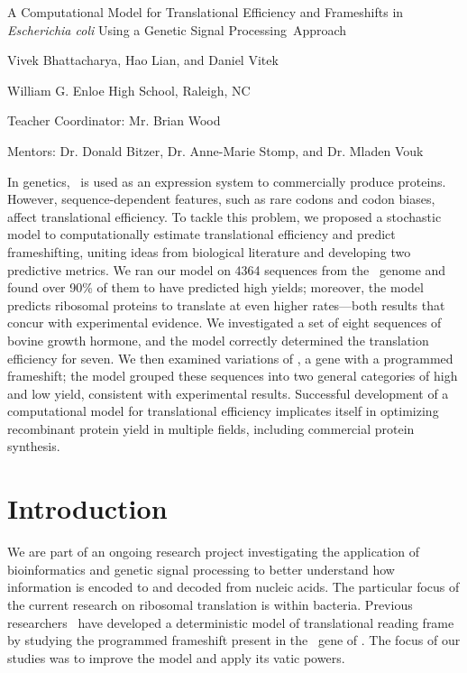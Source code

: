 \documentclass[11pt]{article}
\newcommand{\BWFtitle}[2]{A Computational Model for Translational
  Efficiency and Frameshifts in #1{Escherichia coli} Using a Genetic Signal
  Processing#2Approach}
\begin{document}
\begin{center}
\noindent\BWFtitle{\emph}{~}

Vivek Bhattacharya, Hao Lian, and Daniel Vitek

William G. Enloe High School, Raleigh, NC

Teacher Coordinator: Mr. Brian Wood

Mentors: Dr. Donald Bitzer, Dr. Anne-Marie Stomp, and Dr. Mladen Vouk
\end{center}
\begin{onecolabstract}

In genetics, \ecoli\ is used as an expression system to commercially
produce proteins. However, sequence-dependent features, such as rare
codons and codon biases, affect translational efficiency. To tackle
this problem, we proposed a stochastic model to computationally
estimate translational efficiency and predict frameshifting, uniting
ideas from biological literature and developing two predictive
metrics. We ran our model on 4364 sequences from the \ecoli\ genome
and found over 90\% of them to have predicted high yields; moreover,
the model predicts ribosomal proteins to translate at even higher
rates---both results that concur with experimental evidence. We
investigated a set of eight sequences of bovine growth hormone, and
the model correctly determined the translation efficiency for seven.
We then examined variations of \prfB, a gene with a programmed
frameshift; the model grouped these sequences into two general
categories of high and low yield, consistent with experimental
results. Successful development of a computational model for
translational efficiency implicates itself in optimizing recombinant
protein yield in multiple fields, including commercial protein
synthesis.
\end{onecolabstract}
\newpage

\section{Introduction}
We are part of an ongoing research project
investigating the application of bioinformatics
and genetic signal processing to better understand how
information is encoded to and decoded from nucleic acids.  The particular
focus of the current research on ribosomal translation is within
bacteria.  Previous researchers~\cite{lalit:mechanics}
have developed a deterministic model
of translational reading frame by studying the
programmed frameshift present in the \prfB\ gene of \ecoli.  The focus
of our studies was to improve the model and apply its vatic powers.
\end{document}
